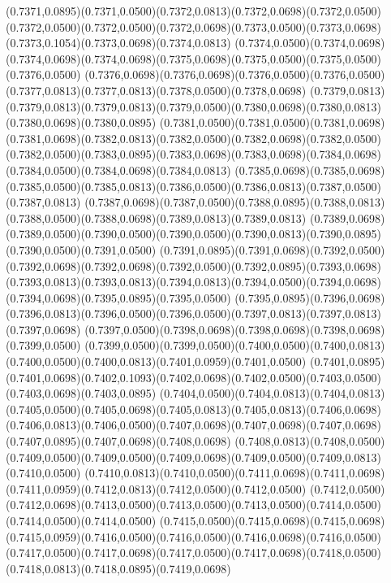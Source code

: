 (0.7371,0.0895)(0.7371,0.0500)(0.7372,0.0813)(0.7372,0.0698)(0.7372,0.0500)
\PST@Solid(0.7372,0.0500)(0.7372,0.0500)(0.7372,0.0698)(0.7373,0.0500)(0.7373,0.0698)(0.7373,0.1054)(0.7373,0.0698)(0.7374,0.0813)
(0.7374,0.0500)(0.7374,0.0698)(0.7374,0.0698)(0.7374,0.0698)(0.7375,0.0698)(0.7375,0.0500)(0.7375,0.0500)(0.7376,0.0500)
(0.7376,0.0698)(0.7376,0.0698)(0.7376,0.0500)(0.7376,0.0500)(0.7377,0.0813)(0.7377,0.0813)(0.7378,0.0500)(0.7378,0.0698)
(0.7379,0.0813)(0.7379,0.0813)(0.7379,0.0813)(0.7379,0.0500)(0.7380,0.0698)(0.7380,0.0813)(0.7380,0.0698)(0.7380,0.0895)
(0.7381,0.0500)(0.7381,0.0500)(0.7381,0.0698)(0.7381,0.0698)(0.7382,0.0813)(0.7382,0.0500)(0.7382,0.0698)(0.7382,0.0500)
(0.7382,0.0500)(0.7383,0.0895)(0.7383,0.0698)(0.7383,0.0698)(0.7384,0.0698)(0.7384,0.0500)(0.7384,0.0698)(0.7384,0.0813)
(0.7385,0.0698)(0.7385,0.0698)(0.7385,0.0500)(0.7385,0.0813)(0.7386,0.0500)(0.7386,0.0813)(0.7387,0.0500)(0.7387,0.0813)
(0.7387,0.0698)(0.7387,0.0500)(0.7388,0.0895)(0.7388,0.0813)(0.7388,0.0500)(0.7388,0.0698)(0.7389,0.0813)(0.7389,0.0813)
(0.7389,0.0698)(0.7389,0.0500)(0.7390,0.0500)(0.7390,0.0500)(0.7390,0.0813)(0.7390,0.0895)(0.7390,0.0500)(0.7391,0.0500)
(0.7391,0.0895)(0.7391,0.0698)(0.7392,0.0500)(0.7392,0.0698)(0.7392,0.0698)(0.7392,0.0500)(0.7392,0.0895)(0.7393,0.0698)
(0.7393,0.0813)(0.7393,0.0813)(0.7394,0.0813)(0.7394,0.0500)(0.7394,0.0698)(0.7394,0.0698)(0.7395,0.0895)(0.7395,0.0500)
(0.7395,0.0895)(0.7396,0.0698)(0.7396,0.0813)(0.7396,0.0500)(0.7396,0.0500)(0.7397,0.0813)(0.7397,0.0813)(0.7397,0.0698)
(0.7397,0.0500)(0.7398,0.0698)(0.7398,0.0698)(0.7398,0.0698)(0.7399,0.0500)
\PST@Solid(0.7399,0.0500)(0.7399,0.0500)(0.7400,0.0500)(0.7400,0.0813)(0.7400,0.0500)(0.7400,0.0813)(0.7401,0.0959)(0.7401,0.0500)
(0.7401,0.0895)(0.7401,0.0698)(0.7402,0.1093)(0.7402,0.0698)(0.7402,0.0500)(0.7403,0.0500)(0.7403,0.0698)(0.7403,0.0895)
(0.7404,0.0500)(0.7404,0.0813)(0.7404,0.0813)(0.7405,0.0500)(0.7405,0.0698)(0.7405,0.0813)(0.7405,0.0813)(0.7406,0.0698)
(0.7406,0.0813)(0.7406,0.0500)(0.7407,0.0698)(0.7407,0.0698)(0.7407,0.0698)(0.7407,0.0895)(0.7407,0.0698)(0.7408,0.0698)
(0.7408,0.0813)(0.7408,0.0500)(0.7409,0.0500)(0.7409,0.0500)(0.7409,0.0698)(0.7409,0.0500)(0.7409,0.0813)(0.7410,0.0500)
(0.7410,0.0813)(0.7410,0.0500)(0.7411,0.0698)(0.7411,0.0698)(0.7411,0.0959)(0.7412,0.0813)(0.7412,0.0500)(0.7412,0.0500)
(0.7412,0.0500)(0.7412,0.0698)(0.7413,0.0500)(0.7413,0.0500)(0.7413,0.0500)(0.7414,0.0500)(0.7414,0.0500)(0.7414,0.0500)
(0.7415,0.0500)(0.7415,0.0698)(0.7415,0.0698)(0.7415,0.0959)(0.7416,0.0500)(0.7416,0.0500)(0.7416,0.0698)(0.7416,0.0500)
(0.7417,0.0500)(0.7417,0.0698)(0.7417,0.0500)(0.7417,0.0698)(0.7418,0.0500)(0.7418,0.0813)(0.7418,0.0895)(0.7419,0.0698)
